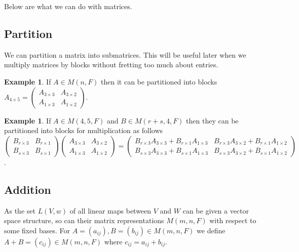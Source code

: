 \documentclass[12pt]{amsart}
\theoremstyle{definition}
\newtheorem{example}[theorem]{Example}
\begin{document}
Below are what we can do with matrices.

\subsection{Partition} We can  partition a matrix into submatrices. This will be useful later when we multiply matrices by blocks without fretting too much about entries.

\begin{example}\label{} If $A \in M(n, F)$ then it can be partitioned into blocks $A_{4 \times 5} = \left(\begin{array}{cc} A_{3 \times 3} & A_{3 \times 2} \\ A_{1 \times 3} & A_{1 \times 2} \end{array}\right)$. 
\end{example}

\begin{example}\label{} If $A \in M(4,5,F)$ and $B \in M(r+s, 4, F)$ then they can be partitioned into blocks for multiplication as follows
$$\left(\begin{array}{cc} B_{r \times 3} & B_{r \times 1} \\ B_{s \times 3} & B_{s \times 1} \end{array}\right) \left(\begin{array}{cc} A_{3 \times 3} & A_{3 \times 2} \\ A_{1 \times 3} & A_{1 \times 2} \end{array}\right) = \left(\begin{array}{cc} B_{r \times 3}A_{3 \times 3} + B_{r \times 1}A_{1 \times 3} & B_{r \times 3}A_{3 \times 2} + B_{r \times 1}A_{1 \times 2} \\ B_{s \times 3}A_{3 \times 3} + B_{s \times 1}A_{1 \times 3} & B_{s \times 3}A_{3 \times 2} + B_{s \times 1}A_{1 \times 2} \end{array}\right)$$.
\end{example}

\subsection{Addition} As the set $L(V, w)$ of all linear maps between $V$ and $W$ can be given a vector space structure, so can their matrix representations $M(m, n,F)$ with respect to some fixed bases.
\dfn For $A = (a_{ij}), B = (b_{ij}) \in M(m, n,F)$ we define $A + B = (c_{ij}) \in M(m, n,F)$ where $c_{ij} = a_{ij} + b_{ij}$.
\end{document}
